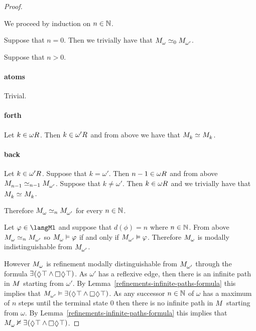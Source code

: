 \begin{proof}
\begin{enumerate}
        We proceed by induction on $n \in \mathbb{N}$.

        Suppose that $n = 0$. Then we trivially have that $\kPModel{\omega} \bisimilar[0] \kPModel{\omega'}$.

        Suppose that $n > 0$.

        \paragraph{atoms} Trivial.

        \paragraph{forth} Let $k \in \kSuccessors{}{\omega}$. Then $k \in \kSuccessors{}{\omega'}$ and from above we have that $\kPModel{k} \bisimilar \kPModel{k}$.

        \paragraph{back} Let $k \in \kSuccessors{}{\omega'}$.
        Suppose that $k = \omega'$. Then $n - 1 \in \kSuccessors{}{\omega}$ and from above $\kPModel{n - 1} \bisimilar[n - 1] \kPModel{\omega'}$.
        Suppose that $k \neq \omega'$. Then $k \in \kSuccessors{}{\omega}$ and we trivially have that $\kPModel{k} \bisimilar \kPModel{k}$.
\end{enumerate}

Therefore $\kPModel{\omega} \bisimilar[n] \kPModel{\omega'}$ for every $n \in \mathbb{N}$.

Let $\phi \in \langMl$ and suppose that $d(\phi) = n$ where $n \in \mathbb{N}$.
From above $\kPModel{\omega} \bisimilar[n] \kPModel{\omega'}$ so $\kPModel{\omega} \entails \phi$ if and only if $\kPModel{\omega'} \entails \phi$.
Therefore $\kPModel{\omega}$ is modally indistinguishable from $\kPModel{\omega'}$.

However $\kPModel{\omega}$ is refinement modally distinguishable from $\kPModel{\omega'}$ through the \langRml{} formula $\somerefs (\possible \top \land \necessary \possible \top)$. 
As $\omega'$ has a reflexive edge, then there is an infinite path in $\kModel$ starting from $\omega'$.
By Lemma~\ref{refinements-infinite-paths-formula} this implies that $\kPModel{\omega'} \entails \somerefs (\possible \top \land \necessary \possible \top)$.
As any successor $n \in \mathbb{N}$ of $\omega$ has a maximum of $n$ steps until the terminal state $0$ then there is no infinite path in $\kModel$ starting from $\omega$.
By Lemma~\ref{refinements-infinite-paths-formula} this implies that $\kPModel{\omega} \nentails \somerefs (\possible \top \land \necessary \possible \top)$.
\end{proof}

